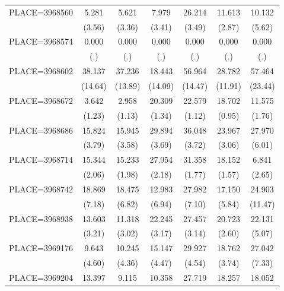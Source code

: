 {\begin{tabular}{l*{6}{c}}
PLACE=3968560       &       5.281&       5.621&       7.979&      26.214&      11.613&      10.132\\
                    &      (3.56)&      (3.36)&      (3.41)&      (3.49)&      (2.87)&      (5.62)\\
PLACE=3968574       &       0.000&       0.000&       0.000&       0.000&       0.000&       0.000\\
                    &         (.)&         (.)&         (.)&         (.)&         (.)&         (.)\\
PLACE=3968602       &      38.137&      37.236&      18.443&      56.964&      28.782&      57.464\\
                    &     (14.64)&     (13.89)&     (14.09)&     (14.47)&     (11.91)&     (23.44)\\
PLACE=3968672       &       3.642&       2.958&      20.309&      22.579&      18.702&      11.575\\
                    &      (1.23)&      (1.13)&      (1.34)&      (1.12)&      (0.95)&      (1.76)\\
PLACE=3968686       &      15.824&      15.945&      29.894&      36.048&      23.967&      27.970\\
                    &      (3.79)&      (3.58)&      (3.69)&      (3.72)&      (3.06)&      (6.01)\\
PLACE=3968714       &      15.344&      15.233&      27.954&      31.358&      18.152&       6.841\\
                    &      (2.06)&      (1.98)&      (2.18)&      (1.77)&      (1.57)&      (2.65)\\
PLACE=3968742       &      18.869&      18.475&      12.983&      27.982&      17.150&      24.903\\
                    &      (7.18)&      (6.82)&      (6.94)&      (7.10)&      (5.84)&     (11.47)\\
PLACE=3968938       &      13.603&      11.318&      22.245&      27.457&      20.723&      22.131\\
                    &      (3.21)&      (3.02)&      (3.17)&      (3.14)&      (2.60)&      (5.07)\\
PLACE=3969176       &       9.643&      10.245&      15.147&      29.927&      18.762&      27.042\\
                    &      (4.60)&      (4.36)&      (4.47)&      (4.54)&      (3.74)&      (7.33)\\
PLACE=3969204       &      13.397&       9.115&      10.358&      27.719&      18.257&      18.052\\

\end{tabular}}
